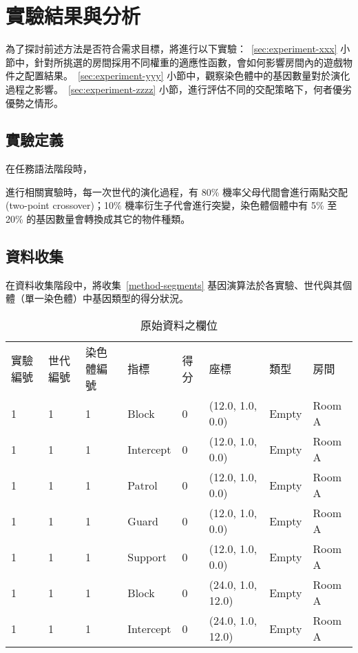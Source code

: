 \renewcommand\thetable{\arabic{chapter}-\arabic{table}}
\chapter{實驗結果與分析}
\label{cha:experiment}

為了探討前述方法是否符合需求目標，將進行以下實驗：~\ref{sec:experiment-xxx} 小節中，針對所挑選的房間採用不同權重的適應性函數，會如何影響房間內的遊戲物件之配置結果。~\ref{sec:experiment-yyy} 小節中，觀察染色體中的基因數量對於演化過程之影響。~\ref{sec:experiment-zzzz} 小節，進行評估不同的交配策略下，何者優劣優勢之情形。

\section{實驗定義}
\label{sec:experiment-definition}

在任務語法階段時，

進行相關實驗時，每一次世代的演化過程，有 80\% 機率父母代間會進行兩點交配 (two-point crossover)；10\% 機率衍生子代會進行突變，染色體個體中有 5\% 至 20\% 的基因數量會轉換成其它的物件種類。






\section{資料收集}
\label{sec:experiment-datacollection}

在資料收集階段中，將收集~\ref{method-segments} 基因演算法於各實驗、世代與其個體（單一染色體）中基因類型的得分狀況。    

\begin{table}[h]
  \centering
  \caption{原始資料之欄位}
  \label{tbl:structure-of-rawdata}
  \bigskip
  \begin{tabular}{| l | l | l | l | l | l | l | l |}
    \hline
    實驗編號 & 世代編號 & 染色體編號 & 指標 & 得分 & 座標 & 類型 & 房間 \\
    1 & 1 & 1 & Block     & 0 & (12.0, 1.0, 0.0)  & Empty & Room A \\
    1 & 1 & 1 & Intercept & 0 & (12.0, 1.0, 0.0)  & Empty & Room A \\
    1 & 1 & 1 & Patrol    & 0 & (12.0, 1.0, 0.0)  & Empty & Room A \\
    1 & 1 & 1 & Guard     & 0 & (12.0, 1.0, 0.0)  & Empty & Room A \\
    1 & 1 & 1 & Support   & 0 & (12.0, 1.0, 0.0)  & Empty & Room A \\
    1 & 1 & 1 & Block     & 0 & (24.0, 1.0, 12.0) & Empty & Room A \\
    1 & 1 & 1 & Intercept & 0 & (24.0, 1.0, 12.0) & Empty & Room A \\
    \hline
  \end{tabular}
\end{table}



